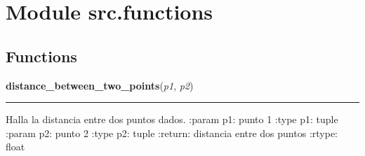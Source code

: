 %
%
%


\section{Module src.functions}

    \label{src:functions}


  \subsection{Functions}

    \label{src:functions:distance_between_two_points}

    \vspace{0.5ex}

\hspace{.8\funcindent}\begin{boxedminipage}{\funcwidth}

    \raggedright \textbf{distance\_between\_two\_points}(\textit{p1}, \textit{p2})

    \vspace{-1.5ex}

    \rule{\textwidth}{0.5\fboxrule}
\setlength{\parskip}{2ex}
    Halla la distancia entre dos puntos dados. :param p1: punto 1 :type p1:
    tuple :param p2: punto 2 :type p2: tuple :return: distancia entre dos 
    puntos :rtype: float

\setlength{\parskip}{1ex}
    \end{boxedminipage}

    \label{src:functions:direction_between_two_points}

